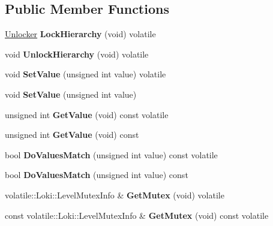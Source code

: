 \subsection*{Public Member Functions}
\begin{DoxyCompactItemize}
\item 
\hypertarget{classLevelThing_a192195e4b1157e91e4630d7a92eb5322}{}\hyperlink{classUnlocker}{Unlocker} {\bfseries Lock\+Hierarchy} (void) volatile\label{classLevelThing_a192195e4b1157e91e4630d7a92eb5322}

\item 
\hypertarget{classLevelThing_a8c7a6cd89867b0f593f51758dc714ea4}{}void {\bfseries Unlock\+Hierarchy} (void) volatile\label{classLevelThing_a8c7a6cd89867b0f593f51758dc714ea4}

\item 
\hypertarget{classLevelThing_a14a02d675819a1ba64fea7ab9e25cd17}{}void {\bfseries Set\+Value} (unsigned int value) volatile\label{classLevelThing_a14a02d675819a1ba64fea7ab9e25cd17}

\item 
\hypertarget{classLevelThing_aaaff3bbeadae285d1c3385384580369a}{}void {\bfseries Set\+Value} (unsigned int value)\label{classLevelThing_aaaff3bbeadae285d1c3385384580369a}

\item 
\hypertarget{classLevelThing_ac9f24b2455faf30a51aa70d353a3b340}{}unsigned int {\bfseries Get\+Value} (void) const  volatile\label{classLevelThing_ac9f24b2455faf30a51aa70d353a3b340}

\item 
\hypertarget{classLevelThing_a61e2be27ea49db71052607446ab19fe3}{}unsigned int {\bfseries Get\+Value} (void) const \label{classLevelThing_a61e2be27ea49db71052607446ab19fe3}

\item 
\hypertarget{classLevelThing_a5fb4b4d65ee3bc8063c09d6c1c195a7d}{}bool {\bfseries Do\+Values\+Match} (unsigned int value) const  volatile\label{classLevelThing_a5fb4b4d65ee3bc8063c09d6c1c195a7d}

\item 
\hypertarget{classLevelThing_a4cff1dda74f96f72fb48af82272e9a2c}{}bool {\bfseries Do\+Values\+Match} (unsigned int value) const \label{classLevelThing_a4cff1dda74f96f72fb48af82272e9a2c}

\item 
\hypertarget{classLevelThing_ad4e49f3a99c52e38d0ea14624989334d}{}volatile\+::\+Loki\+::\+Level\+Mutex\+Info \& {\bfseries Get\+Mutex} (void) volatile\label{classLevelThing_ad4e49f3a99c52e38d0ea14624989334d}

\item 
\hypertarget{classLevelThing_ad7ce2a26a9bef4e2359a7866e7bda709}{}const volatile\+::\+Loki\+::\+Level\+Mutex\+Info \& {\bfseries Get\+Mutex} (void) const  volatile\label{classLevelThing_ad7ce2a26a9bef4e2359a7866e7bda709}

\end{DoxyCompactItemize}
